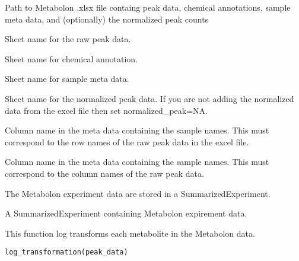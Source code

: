\documentclass[a4paper]{book}
\begin{document}
%
\begin{Arguments}
\begin{ldescription}
\item[\code{path}] Path to Metabolon .xlsx file containg peak data, chemical
annotations, sample meta data, and (optionally) the normalized peak counts

\item[\code{raw\_sheet}] Sheet name for the raw peak data.

\item[\code{chemical\_sheet}] Sheet name for chemical annotation.

\item[\code{sample\_meta}] Sheet name for sample meta data.

\item[\code{normalized\_peak}] Sheet name for the normalized peak data.
If you are not adding the normalized data from the excel file then set
normalized\_peak=NA.

\item[\code{sample\_names}] Column name in the meta data containing the sample names.
This must correspond to the row names of the raw peak data in the excel
file.

\item[\code{chemicalID}] Column name in the meta data containing the sample names.
This must correspond to the column names of the raw peak data.
\end{ldescription}
\end{Arguments}
%
\begin{Details}
The Metabolon experiment data are stored in a SummarizedExperiment.
\end{Details}
%
\begin{Value}
A SummarizedExperiment containing Metabolon expirement data.
\end{Value}
%
\begin{SeeAlso}
\end{SeeAlso}
%
\begin{Description}
This function log transforms each metabolite in the Metabolon data.
\end{Description}
%
\begin{Usage}
\begin{verbatim}
log_transformation(peak_data)
\end{verbatim}
\end{Usage}
\end{document}
